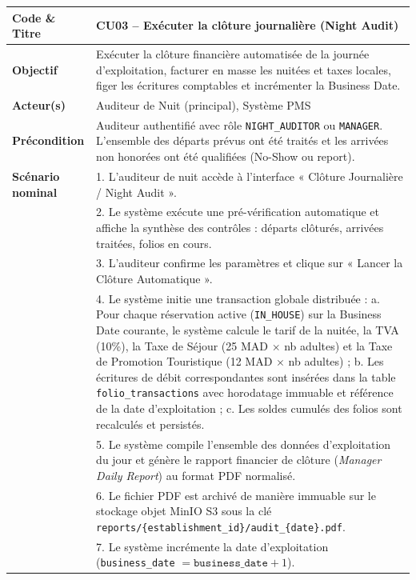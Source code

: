 \documentclass[12pt,a4paper,oneside]{report}
\begin{document}
\begin{table}[H]
\centering
\small
\renewcommand{\arraystretch}{1.2}
\begin{tabularx}{\textwidth}{|p{3.5cm}|X|}
\hline
\textbf{Code \& Titre} & \textbf{CU03 -- Exécuter la clôture journalière (Night Audit)} \\
\hline
\textbf{Objectif} & Exécuter la clôture financière automatisée de la journée d'exploitation, facturer en masse les nuitées et taxes locales, figer les écritures comptables et incrémenter la Business Date. \\
\hline
\textbf{Acteur(s)} & Auditeur de Nuit (principal), Système PMS \\
\hline
\textbf{Précondition} & Auditeur authentifié avec rôle \texttt{NIGHT\_AUDITOR} ou \texttt{MANAGER}. L'ensemble des départs prévus ont été traités et les arrivées non honorées ont été qualifiées (No-Show ou report). \\
\hline
\textbf{Scénario nominal} & 
1. L'auditeur de nuit accède à l'interface « Clôture Journalière / Night Audit ».\\
& 2. Le système exécute une pré-vérification automatique et affiche la synthèse des contrôles : départs clôturés, arrivées traitées, folios en cours.\\
& 3. L'auditeur confirme les paramètres et clique sur « Lancer la Clôture Automatique ».\\
& 4. Le système initie une transaction globale distribuée :
   a. Pour chaque réservation active (\texttt{IN\_HOUSE}) sur la Business Date courante, le système calcule le tarif de la nuitée, la TVA (10\%), la Taxe de Séjour (25 MAD $\times$ nb adultes) et la Taxe de Promotion Touristique (12 MAD $\times$ nb adultes) ;
   b. Les écritures de débit correspondantes sont insérées dans la table \texttt{folio\_transactions} avec horodatage immuable et référence de la date d'exploitation ;
   c. Les soldes cumulés des folios sont recalculés et persistés.\\
& 5. Le système compile l'ensemble des données d'exploitation du jour et génère le rapport financier de clôture (\textit{Manager Daily Report}) au format PDF normalisé.\\
& 6. Le fichier PDF est archivé de manière immuable sur le stockage objet MinIO S3 sous la clé \texttt{reports/\{establishment\_id\}/audit\_\{date\}.pdf}.\\
& 7. Le système incrémente la date d'exploitation (\texttt{business\_date} $= \texttt{business\_date} + 1$).\\

\end{tabularx}
\end{table}
\end{document}
